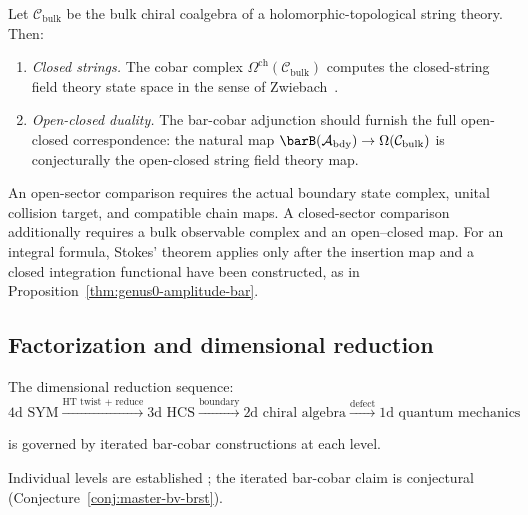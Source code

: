 \begin{conjecture}
\label{conj:closed-string-cobar}
Let $\mathcal{C}_{\mathrm{bulk}}$ be the bulk chiral coalgebra of
a holomorphic-topological string theory.  Then:
\begin{enumerate}
\item \emph{Closed strings.} The cobar complex
  $\Omega^{\mathrm{ch}}(\mathcal{C}_{\mathrm{bulk}})$ computes the
  closed-string field theory state space in the sense of
  Zwiebach~\cite{Zwi93}.
\item \emph{Open-closed duality.} The bar-cobar adjunction
  should furnish the full open-closed correspondence: the natural map
  $\barB(\mathcal{A}_{\mathrm{bdy}}) \to
  \Omega(\mathcal{C}_{\mathrm{bulk}})$ is conjecturally the open-closed string
  field theory map.
\end{enumerate}
\end{conjecture}

\begin{remark}
An open-sector comparison requires the actual boundary state complex, unital collision target, and compatible chain maps.
A closed-sector comparison additionally requires a bulk observable complex and an open--closed map.
For an integral formula, Stokes' theorem applies only after the insertion map and a closed integration functional have been constructed, as in Proposition~\ref{thm:genus0-amplitude-bar}.
\end{remark}

\subsection{Factorization and dimensional reduction}

\begin{conjecture}\label{conj:factorization-dim-tower}
The dimensional reduction sequence:
\[\text{4d SYM} \xrightarrow{\text{HT twist + reduce}}
\text{3d HCS} \xrightarrow{\text{boundary}}
\text{2d chiral algebra} \xrightarrow{\text{defect}}
\text{1d quantum mechanics}\]

is governed by iterated bar-cobar constructions at each level.
\end{conjecture}

\begin{remark}[Scope]
Individual levels are established \cite{BD04,CG17,CWY18}; the iterated bar-cobar claim is conjectural (Conjecture~\ref{conj:master-bv-brst}).
\end{remark}

